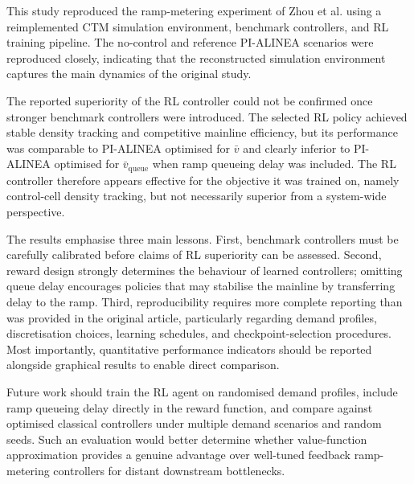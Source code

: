 This study reproduced the ramp-metering experiment of Zhou et al. using a
reimplemented CTM simulation environment, benchmark controllers, and RL training
pipeline. The no-control and reference PI-ALINEA scenarios were reproduced
closely, indicating that the reconstructed simulation environment captures the
main dynamics of the original study.

The reported superiority of the RL controller could not be confirmed once
stronger benchmark controllers were introduced. The selected RL policy achieved
stable density tracking and competitive mainline efficiency, but its performance
was comparable to PI-ALINEA optimised for \(\bar{v}\) and clearly inferior to
PI-ALINEA optimised for \(\bar{v}_{\mathrm{queue}}\) when ramp queueing delay was
included. The RL controller therefore appears effective for the objective it was
trained on, namely control-cell density tracking, but not necessarily superior
from a system-wide perspective.

The results emphasise three main lessons. First, benchmark controllers must be
carefully calibrated before claims of RL superiority can be assessed. Second,
reward design strongly determines the behaviour of learned controllers; omitting
queue delay encourages policies that may stabilise the mainline by transferring
delay to the ramp. Third, reproducibility requires more complete reporting than was provided in
the original article, particularly regarding demand profiles, discretisation
choices, learning schedules, and checkpoint-selection procedures. Most
importantly, quantitative performance indicators should be reported alongside
graphical results to enable direct comparison.

Future work should train the RL agent on randomised demand profiles, include
ramp queueing delay directly in the reward function, and compare against
optimised classical controllers under multiple demand scenarios and random
seeds. Such an evaluation would better determine whether value-function
approximation provides a genuine advantage over well-tuned feedback ramp-metering
controllers for distant downstream bottlenecks.

\clearpage